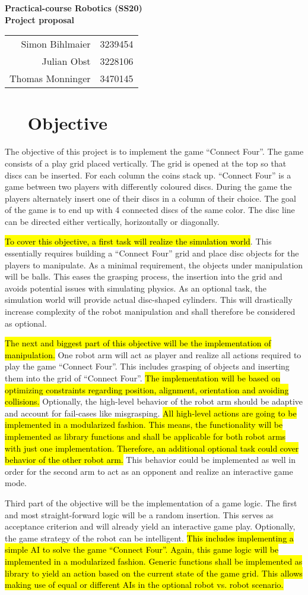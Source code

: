 \documentclass[11pt,pdftex,a4paper]{article}
\newcounter{sheetnumber}
\newcounter{exnum}
\renewcommand{\title}
{\begin{center}
		\begin{Huge}
            \textbf{Practical-course Robotics (SS20)}\\[0.3cm]
			 \textbf{Project proposal} \\[0.3cm]
		\end{Huge}
		
		\begin{tabular}{rl}
			Simon Bihlmaier	 	 & 3239454 \\
			Julian Obst 		 & 3228106 \\
			Thomas Monninger	 & 3470145 \\
		\end{tabular}
		
	\end{center}
	
}
\newcommand{\ex}[1]{\section*{\theexnum $\quad$ #1 \stepcounter{exnum}}}
\begin{document}
	
	
	\setcounter{exnum}{1}
	\setcounter{sheetnumber}{0}
	\thispagestyle{empty}
	\title

    \ex{Objective}
	The objective of this project is to implement the game ``Connect Four''. 
	The game consists of a play grid placed vertically. 
	The grid is opened at the top so that discs can be inserted. 
	For each column the coins stack up. 
	``Connect Four'' is a game between two players with differently coloured discs. 
	During the game the players alternately insert one of their discs in a column of their choice. 
	The goal of the game is to end up with 4 connected discs of the same color. 
	The disc line can be directed either vertically, horizontally or diagonally.
	
	\hl{To cover this objective, a first task will realize the simulation world}. 
	This essentially requires building a ``Connect Four'' grid and place disc objects for the players to manipulate. 
	As a minimal requirement, the objects under manipulation will be balls. 
	This eases the grasping process, the insertion into the grid and avoids potential issues with simulating physics. 
	As an optional task, the simulation world will provide actual disc-shaped cylinders. 
	This will drastically increase complexity of the robot manipulation and shall therefore be considered as optional. 
	
	\hl{The next and biggest part of this objective will be the implementation of manipulation.} 
	One robot arm will act as player and realize all actions required to play the game ``Connect Four''. 
	This includes grasping of objects and inserting them into the grid of ``Connect Four''. 
	\hl{The implementation will be based on optimizing constraints regarding position, alignment, orientation and avoiding collisions.} 
	Optionally, the high-level behavior of the robot arm should be adaptive and account for fail-cases like misgrasping. 
	\hl{All high-level actions are going to be implemented in a modularized fashion.
	This means, the functionality will be implemented as library functions and shall be applicable for both robot arms with just one implementation.
	Therefore, an additional optional task could cover behavior of the other robot arm.}
	This behavior could be implemented as well in order for the second arm to act as an opponent and realize an interactive game mode.
	
	Third part of the objective will be the implementation of a game logic. 
	The first and most straight-forward logic will be a random insertion. 
	This serves as acceptance criterion and will already yield an interactive game play. 
	Optionally, the game strategy of the robot can be intelligent. 
	\hl{This includes implementing a simple AI to solve the game ``Connect Four''.
	Again, this game logic will be implemented in a modularized fashion. 
	Generic functions shall be implemented as library to yield an action based on the current state of the game grid. 
	This allows making use of equal or different AIs in the optional robot vs. robot scenario.}
	 
\end{document}

